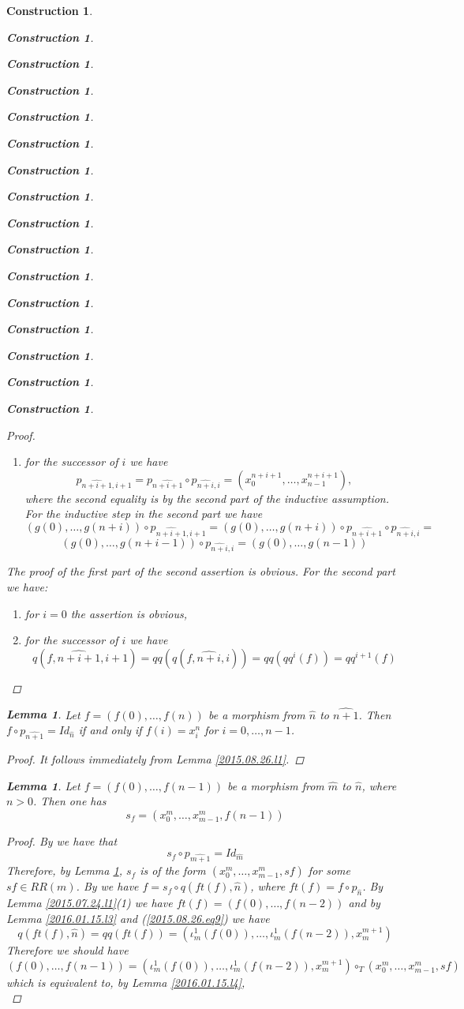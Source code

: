 \documentclass[12pt]{amsart}
\newenvironment{eq}{\begin{equation}}{\end{equation}}
\newtheorem{lemma}[proposition]{Lemma}
\newtheorem{construction}[proposition]{Construction}
\newcommand{\llabel}[1]{\label{#1}}
\newcommand{\wh}{\widehat}
\newcommand{\hc}{\circ_{T}}
\begin{document}
\begin{construction}
\begin{construction}
\begin{construction}
\begin{construction}
\begin{construction}
\begin{construction}
\begin{construction}
\begin{construction}
\begin{construction}
\begin{construction}
\begin{construction}
\begin{construction}
\begin{construction}
\begin{construction}
\begin{construction}
\begin{construction}
\begin{proof}
\begin{enumerate}
\item for the successor of $i$ we have
%
$$p_{\wh{n+i+1},i+1}=p_{\wh{n+i+1}}\circ p_{\wh{n+i},i}=(x_0^{n+i+1},\dots,x_{n-1}^{n+i+1}),$$
%
where the second equality is by the second part of the inductive
assumption. For the inductive step in the second part we have
%
$$(g(0),\dots,g(n+i))\circ p_{\wh{n+i+1},i+1}=(g(0),\dots,g(n+i))\circ p_{\wh{n+i+1}}\circ p_{\wh{n+i},i}=$$$$
(g(0),\dots,g(n+i-1))\circ p_{\wh{n+i},i}=(g(0),\dots,g(n-1))$$
%
\end{enumerate}
%
The proof of the first part of the second assertion is obvious. For the second
part we have:
%
\begin{enumerate}
\item for $i=0$ the assertion is obvious,
\item for the successor of $i$ we have 
%
$$q(f,\wh{n+i+1},i+1)=qq(q(f,\wh{n+i},i))=qq(qq^i(f))=qq^{i+1}(f)$$
%
\end{enumerate}
%
\end{proof}
%
\begin{lemma}
\llabel{2015.08.22.l7}
Let $f=(f(0),\dots,f(n))$ be a morphism from $\wh{n}$ to $\wh{n+1}$. Then
$f\circ p_{\wh{n+1}}=Id_{\wh{n}}$ if and only if $f(i)=x_i^{n}$ for
$i=0,\dots,n-1$.
\end{lemma}
%
\begin{proof}
It follows immediately from Lemma \ref{2015.08.26.l1}.
\end{proof}
%
\begin{lemma}
\llabel{2015.09.09.l1}
Let $f=(f(0),\dots,f(n-1))$ be a morphism from $\wh{m}$ to $\wh{n}$, where $n>0$. Then one has
%
$$s_f=(x_0^{m},\dots,x_{m-1}^{m},f(n-1))$$
%
\end{lemma}
%
\begin{proof}
By \cite[Definition 2.3(2)]{Csubsystems} we have that 
%
$$s_f\circ p_{\wh{m+1}}=Id_{\wh{m}}$$
%
Therefore, by Lemma \ref{2015.08.22.l7}, $s_f$ is of the form
$(x_0^m,\dots,x_{m-1}^m,sf)$ for some $sf\in RR(m)$. By \cite[Definition
  2.3(3)]{Csubsystems} we have $f=s_f\circ q(ft(f),\wh{n})$, where $ft(f)=f\circ
p_{\wh{n}}$. By Lemma \ref{2015.07.24.l1}(1) we have
$ft(f)=(f(0),\dots,f(n-2))$ and by Lemma \ref{2016.01.15.l3} and
(\ref{2015.08.26.eq9}) we have
%
$$q(ft(f),\wh{n})=qq(ft(f))=(\iota_m^1(f(0)),\dots,\iota_m^1(f(n-2)),x_{m}^{m+1})$$
%
Therefore we should have
%
$$(f(0),\dots,f(n-1))=(\iota_m^1(f(0)),\dots,\iota_m^1(f(n-2)),x_{m}^{m+1})\hc (x_0^m,\dots,x_{m-1}^m,sf)$$
%
which is equivalent to, by Lemma \ref{2016.01.15.l4}, 
%
\begin{eq}\llabel{2016.01.15.eq6}

\end{eq}
\end{proof}
\end{construction}
\end{construction}
\end{construction}
\end{construction}
\end{construction}
\end{construction}
\end{construction}
\end{construction}
\end{construction}
\end{construction}
\end{construction}
\end{construction}
\end{construction}
\end{construction}
\end{construction}
\end{construction}
\end{document}
